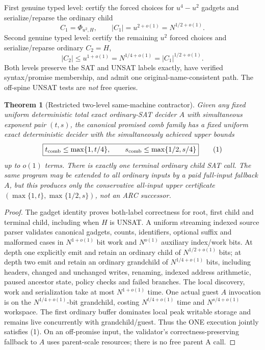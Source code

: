 \documentclass[11pt]{article}
\newtheorem{theorem}{Theorem}
\begin{document}
First genuine typed level: certify the forced choices for $u^4-u^2$ gadgets and serialize/reparse the ordinary child
\[
 C_1=\Phi_{u^2,H},\qquad |C_1|=u^{2+o(1)}=N^{1/2+o(1)}.
\]
Second genuine typed level: certify the remaining $u^2$ forced choices and serialize/reparse ordinary $C_2=H$,
\[
 |C_2|\le u^{1+o(1)}=N^{1/4+o(1)}
      =|C_1|^{1/2+o(1)}.
\]
Both levels preserve the SAT and UNSAT labels exactly, have verified syntax/promise membership, and admit one original-name-consistent path. The off-spine UNSAT tests are \emph{not} free queries.

\begin{theorem}[Restricted two-level same-machine contractor]
Given any fixed uniform deterministic total exact ordinary-SAT decider $A$ with simultaneous exponent pair $(t,s)$, the canonical promised comb family has a fixed uniform exact deterministic decider with the simultaneously achieved upper bounds
\[
\boxed{
t_{\rm comb}\le\max\{1,t/4\},\qquad
s_{\rm comb}\le\max\{1/2,s/4\}
}\tag{1}
\]
up to $o(1)$ terms. There is exactly one terminal ordinary child SAT call. The same program may be extended to all ordinary inputs by a paid full-input fallback $A$, but this produces only the conservative all-input upper certificate $(\max\{1,t\},\max\{1/2,s\})$, not an ARC successor.
\end{theorem}
\begin{proof}
The gadget identity proves both-label correctness for root, first child and terminal child, including when $H$ is UNSAT. A uniform streaming indexed source parser validates canonical gadgets, counts, identifiers, optional suffix and malformed cases in $N^{1+o(1)}$ bit work and $N^{o(1)}$ auxiliary index/work bits. At depth one explicitly emit and retain an ordinary child of $N^{1/2+o(1)}$ bits; at depth two emit and retain an ordinary grandchild of $N^{1/4+o(1)}$ bits, including headers, changed and unchanged writes, renaming, indexed address arithmetic, paused ancestor state, policy checks and failed branches. The local discovery, work and serialization take at most $N^{1+o(1)}$ time. One actual guest $A$ invocation is on the $N^{1/4+o(1)}$-bit grandchild, costing $N^{t/4+o(1)}$ time and $N^{s/4+o(1)}$ workspace. The first ordinary buffer dominates local peak writable storage and remains live concurrently with grandchild/guest. Thus the ONE execution jointly satisfies (1). On an off-promise input, the validator's correctness-preserving fallback to $A$ uses parent-scale resources; there is no free parent A call.
\end{proof}
\end{document}

